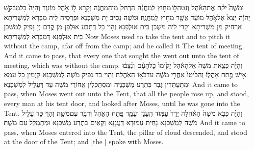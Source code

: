 {וּמֹשֶׁה֩ יִקַּ֨ח אֶת\maqqaf הָאֹ֜הֶל וְנָֽטָה\maqqaf ל֣וֹ \legarmeh  מִח֣וּץ לַֽמַּחֲנֶ֗ה הַרְחֵק֙ מִן\maqqaf הַֽמַּחֲנֶ֔ה וְקָ֥רָא ל֖וֹ אֹ֣הֶל מוֹעֵ֑ד וְהָיָה֙ כׇּל\maqqaf מְבַקֵּ֣שׁ יְהֹוָ֔ה יֵצֵא֙ אֶל\maqqaf אֹ֣הֶל מוֹעֵ֔ד אֲשֶׁ֖ר מִח֥וּץ לַֽמַּחֲנֶֽה׃}
{וּמֹשֶׁה נָסֵיב יָת מַשְׁכְּנָא וּפַרְסֵיהּ לֵיהּ מִבַּרָא לְמַשְׁרִיתָא אַרְחֵיק מִן מַשְׁרִיתָא וְקָרֵי לֵיהּ מַשְׁכַּן בֵּית אוּלְפָנָא וְהָוֵי כָּל דְּתָבַע אוּלְפָן מִן קֳדָם יְיָ נָפֵיק לְמַשְׁכַּן בֵּית אוּלְפָנָא דְּמִבַּרָא לְמַשְׁרִיתָא׃}
{Now Moses used to take the tent and to pitch it without the camp, afar off from the camp; and he called it The tent of meeting. And it came to pass, that every one that sought the \lord\space went out unto the tent of meeting, which was without the camp.}{}
{וְהָיָ֗ה כְּצֵ֤את מֹשֶׁה֙ אֶל\maqqaf הָאֹ֔הֶל יָק֙וּמוּ֙ כׇּל\maqqaf הָעָ֔ם וְנִ֨צְּב֔וּ אִ֖ישׁ פֶּ֣תַח אׇהֳל֑וֹ וְהִבִּ֙יטוּ֙ אַחֲרֵ֣י מֹשֶׁ֔ה עַד\maqqaf בֹּא֖וֹ הָאֹֽהֱלָה׃}
{וְהָוֵי כַּד נָפֵיק מֹשֶׁה לְמַשְׁכְּנָא קָיְמִין כָּל עַמָּא וּמִתְעַתְּדִין גְּבַר בִּתְרַע מַשְׁכְּנֵיהּ וּמִסְתַּכְּלִין אֲחוֹרֵי מֹשֶׁה עַד דְּעָלֵיל לְמַשְׁכְּנָא׃}
{And it came to pass, when Moses went out unto the Tent, that all the people rose up, and stood, every man at his tent door, and looked after Moses, until he was gone into the Tent.}{}
{וְהָיָ֗ה כְּבֹ֤א מֹשֶׁה֙ הָאֹ֔הֱלָה יֵרֵד֙ עַמּ֣וּד הֶֽעָנָ֔ן וְעָמַ֖ד פֶּ֣תַח הָאֹ֑הֶל וְדִבֶּ֖ר עִם\maqqaf מֹשֶֽׁה׃}
{וְהָוֵי כַּד עָלֵיל מֹשֶׁה לְמַשְׁכְּנָא נָחֵית עַמּוּדָא דַּעֲנָנָא וְקָאֵים בִּתְרַע מַשְׁכְּנָא וּמִתְמַלַּל עִם מֹשֶׁה׃}
{And it came to pass, when Moses entered into the Tent, the pillar of cloud descended, and stood at the door of the Tent; and [the \lord] spoke with Moses.}{}
